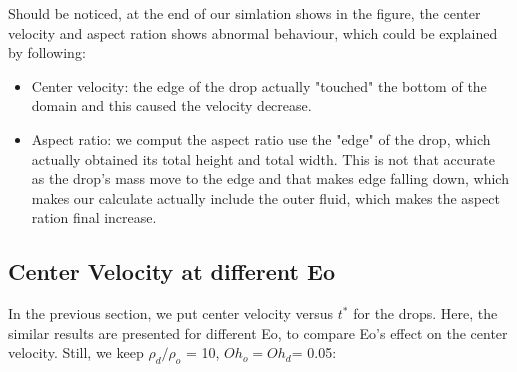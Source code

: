 \documentclass[12pt]{article}
\begin{document}
Should be noticed, at the end of our simlation shows in the figure, the center velocity and aspect ration shows abnormal behaviour, which could be explained by following:
\begin{itemize}
    \item Center velocity: the edge of the drop actually "touched" the bottom of the domain and this caused the velocity decrease. 
    \item Aspect ratio: we comput the aspect ratio use the "edge" of the drop, which actually obtained its total height and total width. This is not that accurate as the drop's mass move to the edge and that makes edge falling down, which makes our calculate actually include the outer fluid, which makes the aspect ration final increase.
\end{itemize}


\subsection{Center Velocity at different Eo}
In the previous section, we put center velocity versus $t^*$ for the drops. Here, the similar results are presented for different Eo, to compare Eo's effect on the center velocity. Still, we keep $\rho_d/\rho_o$ = 10, $Oh_o=Oh_d$= 0.05:
\end{document}
